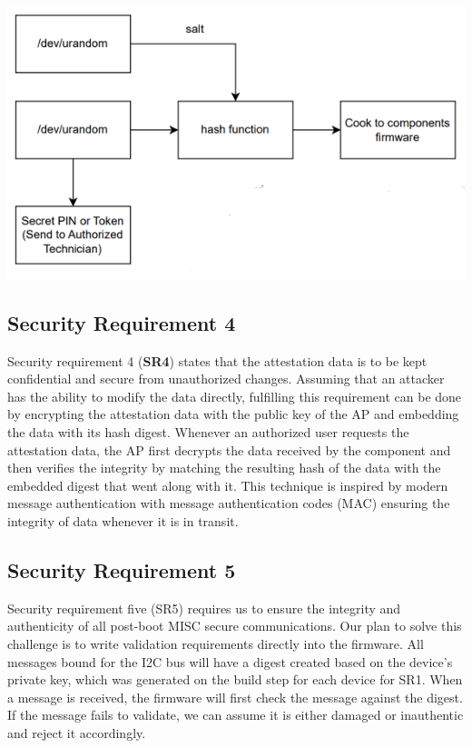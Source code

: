 \documentclass{prace}
\begin{document}
\includegraphics{./diagramSR3.png}

\subsection{Security Requirement 4}

Security requirement 4 (\textbf{SR4}) states that the attestation data is to be kept confidential and secure from unauthorized changes.
 Assuming that an attacker has the ability to modify the data directly, fulfilling this requirement can be done by encrypting 
 the attestation data with the public key of the AP and embedding the data with its hash digest. Whenever an authorized user 
 requests the attestation data, the AP first decrypts the data received by the component and then verifies the integrity by 
 matching the resulting hash of the data with the embedded digest that went along with it. This technique is inspired by modern 
 message authentication with message authentication codes (MAC) ensuring the integrity of data whenever it is in transit.


\subsection{Security Requirement 5}

Security requirement five (SR5) requires us to ensure the integrity and authenticity of all post-boot MISC secure communications. Our 
plan to solve this challenge is to write validation requirements directly into the firmware. All messages bound for the I2C bus will have 
a digest created based on the device's private key, which was generated on the build step for each device for SR1. When a message is received, 
the firmware will first check the message against the digest. If the message fails to validate, we can assume it is either damaged or inauthentic 
and reject it accordingly.
\end{document}
